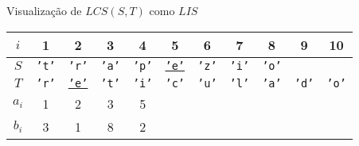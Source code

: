 \begin{frame}[fragile]{Visualização de $LCS(S, T)$ como $LIS$}

    \begin{table}
        \centering

        \begin{tabular}{c|cccccccccc} 
        \hline 
        $i$ & 1 & 2 & 3 & 4 & 5 & 6 & 7 & 8 & 9 & 10\\
        \hline
        $S$
        & {\textcolor{blue!80!black}{\texttt{'t'}}}
        & {\textcolor{blue!80!black}{\texttt{'r'}}}
        & {\textcolor{blue!80!black}{\texttt{'a'}}}
        & \textcolor{blue!80!black}{\texttt{'p'}}
        & \underline{\textcolor{blue!80!black}{\texttt{'e'}}}
        & \textcolor{blue!80!black}{\texttt{'z'}}
        & \textcolor{blue!80!black}{\texttt{'i'}}
        & \textcolor{blue!80!black}{\texttt{'o'}} \\
        $T$
        & {\textcolor{green!50!black}{\texttt{'r'}}}
        & \underline{\textcolor{green!50!black}{\texttt{'e'}}}
        & \textcolor{green!50!black}{\texttt{'t'}}
        & \textcolor{green!50!black}{\texttt{'i'}}
        & \textcolor{green!50!black}{\texttt{'c'}}
        & \textcolor{green!50!black}{\texttt{'u'}}
        & \textcolor{green!50!black}{\texttt{'l'}}
        & {\textcolor{green!50!black}{\texttt{'a'}}}
        & \textcolor{green!50!black}{\texttt{'d'}}
        & \textcolor{green!50!black}{\texttt{'o'}} \\
        $a_i$ & 1 & 2 & 3 & 5\\
        $b_i$ & 3 & 1 & 8 & 2\\
        \hline
        \end{tabular}

    \end{table}

\end{frame}

